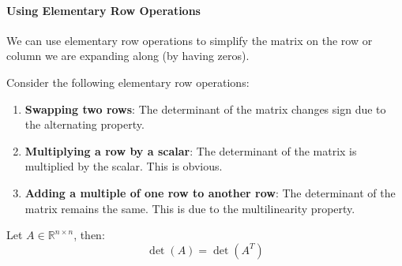 \documentclass[11pt]{article}
\begin{document}
\paragraph{Using Elementary Row Operations} We can use elementary row operations to simplify the matrix on the row or column we are expanding along (by having zeros).
\begin{theorem}
    Consider the following elementary row operations:
    \begin{enumerate}
        \item \textbf{Swapping two rows}: The determinant of the matrix changes sign due to the alternating property.
        \item \textbf{Multiplying a row by a scalar}: The determinant of the matrix is multiplied by the scalar. This is obvious.
        \item \textbf{Adding a multiple of one row to another row}: The determinant of the matrix remains the same. This is due to the multilinearity property.
    \end{enumerate}
\end{theorem}
\begin{theorem}
    Let $A \in \mathbb{R}^{n \times n}$, then:
    \begin{equation}
        \det(A) = \det(A^T)
    \end{equation}
\end{theorem}
\end{document}
